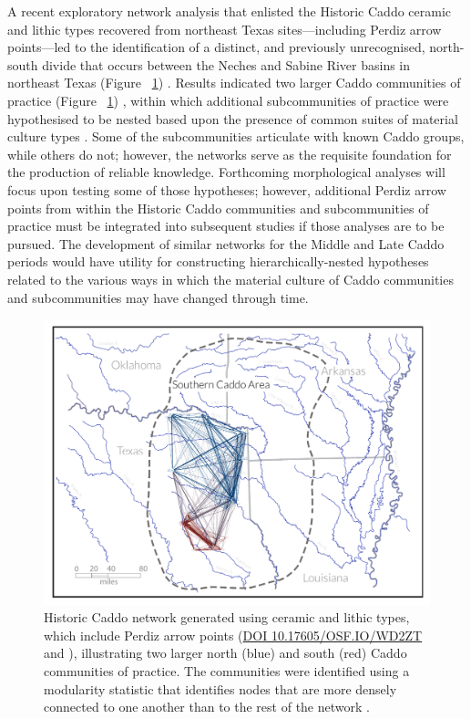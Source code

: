 \documentclass[review]{elsarticle}
\begin{document}
A recent exploratory network analysis that enlisted the Historic Caddo ceramic and lithic types recovered from northeast Texas sites---including Perdiz arrow points---led to the identification of a distinct, and previously unrecognised, north-south divide that occurs between the Neches and Sabine River basins in northeast Texas (Figure ~\ref{fig:fig.net}) \citep{RN8031}. Results indicated two larger Caddo communities of practice (Figure ~\ref{fig:fig.net}) \citep[Figure 16.4]{RN8031}, within which additional subcommunities of practice were hypothesised to be nested based upon the presence of common suites of material culture types \citep[Figures 16.5 and 16.6]{RN8031}. Some of the subcommunities articulate with known Caddo groups, while others do not; however, the networks serve as the requisite foundation for the production of reliable knowledge. Forthcoming morphological analyses will focus upon testing some of those hypotheses; however, additional Perdiz arrow points from within the Historic Caddo communities and subcommunities of practice must be integrated into subsequent studies if those analyses are to be pursued. The development of similar networks for the Middle and Late Caddo periods would have utility for constructing hierarchically-nested hypotheses related to the various ways in which the material culture of Caddo communities and subcommunities may have changed through time.

\begin{figure}[!]\centering
\includegraphics[width=\linewidth]{fig.net.pdf}
\caption{Historic Caddo network generated using ceramic and lithic types, which include Perdiz arrow points (\href{https://osf.io/wd2zt/}{DOI 10.17605/OSF.IO/WD2ZT} and \citealt{RN8031}), illustrating two larger north (blue) and south (red) Caddo communities of practice. The communities were identified using a modularity statistic that identifies nodes that are more densely connected to one another than to the rest of the network \citep{RN8051,RN8024}.}
\label{fig:fig.net}
\end{figure}
\end{document}
